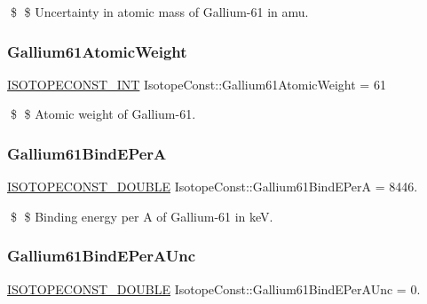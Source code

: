 \$ \$ Uncertainty in atomic mass of Gallium-\/61 in amu. \mbox{\label{group___isotope_const-_gallium-_ga61_ga9ee9d82c893da78cc447474eef40d20e}} 
\subsubsection{\texorpdfstring{Gallium61\+Atomic\+Weight}{Gallium61AtomicWeight}}
{\footnotesize\ttfamily \mbox{\hyperlink{group___isotope_const-_macros_ga5f18360b3e99483a35c32d789e62621c}{I\+S\+O\+T\+O\+P\+E\+C\+O\+N\+S\+T\+\_\+\+I\+NT}} Isotope\+Const\+::\+Gallium61\+Atomic\+Weight = 61}

\$ \$ Atomic weight of Gallium-\/61. \mbox{\label{group___isotope_const-_gallium-_ga61_gaaedd8e036f16ef04dea369274dfd9267}} 
\subsubsection{\texorpdfstring{Gallium61\+Bind\+E\+PerA}{Gallium61BindEPerA}}
{\footnotesize\ttfamily \mbox{\hyperlink{group___isotope_const-_macros_ga8f45a7272ce02c0b4c65c44636ed719a}{I\+S\+O\+T\+O\+P\+E\+C\+O\+N\+S\+T\+\_\+\+D\+O\+U\+B\+LE}} Isotope\+Const\+::\+Gallium61\+Bind\+E\+PerA = 8446.}

\$ \$ Binding energy per A of Gallium-\/61 in keV. \mbox{\label{group___isotope_const-_gallium-_ga61_gad64b1f2fb20684be1d30815f6865e82e}} 
\subsubsection{\texorpdfstring{Gallium61\+Bind\+E\+Per\+A\+Unc}{Gallium61BindEPerAUnc}}
{\footnotesize\ttfamily \mbox{\hyperlink{group___isotope_const-_macros_ga8f45a7272ce02c0b4c65c44636ed719a}{I\+S\+O\+T\+O\+P\+E\+C\+O\+N\+S\+T\+\_\+\+D\+O\+U\+B\+LE}} Isotope\+Const\+::\+Gallium61\+Bind\+E\+Per\+A\+Unc = 0.}

